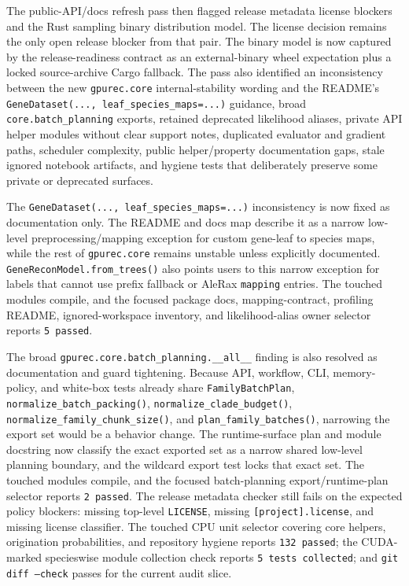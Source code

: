 \documentclass[11pt]{article}
\begin{document}
The public-API/docs refresh pass then flagged release metadata license blockers
and the Rust sampling binary distribution model.  The license decision remains
the only open release blocker from that pair.  The binary model is now captured
by the release-readiness contract as an external-binary wheel expectation plus a
locked source-archive Cargo fallback.  The pass also identified an
inconsistency between the new \texttt{gpurec.core} internal-stability wording
and the README's
\texttt{GeneDataset(..., leaf\_species\_maps=...)} guidance, broad
\texttt{core.batch\_planning} exports, retained deprecated likelihood aliases,
private API helper modules without clear support notes, duplicated evaluator
and gradient paths, scheduler complexity, public helper/property documentation
gaps, stale ignored notebook artifacts, and hygiene tests that deliberately
preserve some private or deprecated surfaces.

The \texttt{GeneDataset(..., leaf\_species\_maps=...)} inconsistency is now
fixed as documentation only.  The README and docs map describe it as a narrow
low-level preprocessing/mapping exception for custom gene-leaf to species maps,
while the rest of \texttt{gpurec.core} remains unstable unless explicitly
documented.  \texttt{GeneReconModel.from\_trees()} also points users to this
narrow exception for labels that cannot use prefix fallback or AleRax
\texttt{mapping} entries.  The touched modules compile, and the focused package
docs, mapping-contract, profiling README, ignored-workspace inventory, and
likelihood-alias owner selector reports \texttt{5 passed}.

The broad \texttt{gpurec.core.batch\_planning.\_\_all\_\_} finding is also
resolved as documentation and guard tightening.  Because API, workflow, CLI,
memory-policy, and white-box tests already share \texttt{FamilyBatchPlan},
\texttt{normalize\_batch\_packing()}, \texttt{normalize\_clade\_budget()},
\texttt{normalize\_family\_chunk\_size()}, and
\texttt{plan\_family\_batches()}, narrowing the export set would be a behavior
change.  The runtime-surface plan and module docstring now classify the exact
exported set as a narrow shared low-level planning boundary, and the wildcard
export test locks that exact set.
The touched modules compile, and the focused batch-planning export/runtime-plan
selector reports \texttt{2 passed}.
The release metadata checker still fails on the expected policy blockers:
missing top-level \texttt{LICENSE}, missing \texttt{[project].license}, and
missing license classifier.  The touched CPU unit selector covering core
helpers, origination probabilities, and repository hygiene reports
\texttt{132 passed}; the CUDA-marked specieswise module collection check
reports \texttt{5 tests collected}; and \texttt{git diff --check} passes for
the current audit slice.
\end{document}
